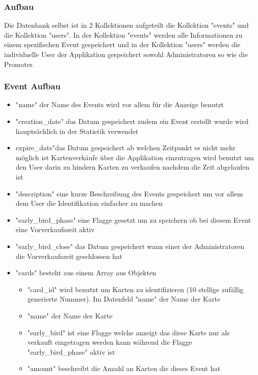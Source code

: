 		\newpage
		
		\subsubsection{Aufbau}
			Die Datenbank selbst ist in 2 Kollektionen aufgeteilt die Kollektion "events" und die Kollektion "users". In der Kollektion "events" werden alle Informationen zu einem spezifischen Event gespeichert und in der Kollektion "users" werden die individuelle User der Applikation gespeichert sowohl Administratoren so wie die Promoter. 

			\subsubsection{Event Aufbau}			
				\begin{itemize}
					\item "name" der Name des Events wird vor allem für die Anzeige benutzt
					\item "creation\_date" das Datum gespeichert zudem ein Event erstellt wurde wird hauptsächlich in der Statistik verwendet
					\item expire\_date"das Datum gespeichert ab welchen Zeitpunkt es nicht mehr möglich ist Kartenverkäufe über die Applikation einzutragen wird benutzt um den User darin zu hindern Karten zu verkaufen nachdem die Zeit abgelaufen ist
					\item "description" eine kurze Beschreibung des Events gespeichert um vor allem dem User die Identifikation einfacher zu machen
					\item "early\_bird\_phase" eine Flagge gesetzt um zu speichern ob bei diesem Event eine Vorverkaufszeit aktiv
					\item "early\_bird\_close" das Datum gespeichert wann einer der Administratoren die Vorverkaufszeit geschlossen hat
					\item "cards" besteht aus einem Array aus Objekten
					\begin{itemize}
						\item "card\_id" wird benutzt um Karten zu identifizieren (10 stellige zufällig generierte Nummer). 
						Im Datenfeld "name" der Name der Karte
						\item "name" der Name der Karte
						\item "early\_bird" ist eine Flagge welche anzeigt das diese Karte nur als verkauft eingetragen werden kann während die Flagge "early\_bird\_phase" aktiv ist
						\item "amount" beschreibt die Anzahl an Karten die dieses Event hat

\end{itemize}
\end{itemize}
